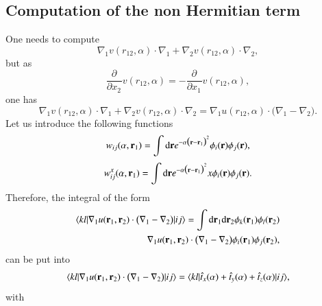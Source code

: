 \documentclass[aip,jcp,reprint,noshowkeys,superscriptaddress]{revtex4-1}
\newcommand{\matelem}[3]{\langle #1 | #2 | #3 \rangle}
\newcommand{\deriv}[3]{\frac{\partial^{#3} #1}{\partial {#2}^{#3}}}
\newcommand{\br}[0]{{\bf {r}}}
\newcommand{\bri}[1]{{\bf r}_{#1}}
\begin{document}
\subsection{Computation of the non Hermitian term}
One needs to compute 
\begin{equation}
 \nabla_1 v(r_{12},\alpha) \cdot \nabla_1 + \nabla_2 v(r_{12},\alpha) \cdot \nabla_2,
\end{equation}
but as 
\begin{equation}
 \deriv{}{x_2}{} v(r_{12},\alpha) = - \deriv{}{x_1}{} v(r_{12},\alpha), 
\end{equation}
one has 
\begin{equation}
  \nabla_1 v(r_{12},\alpha) \cdot \nabla_1 + \nabla_2 v(r_{12},\alpha) \cdot \nabla_2 = \nabla_1 u(r_{12},\alpha) \cdot  \big( \nabla_1 - \nabla_2 \big). 
\end{equation}
Let us introduce the following functions  
\begin{equation}
 w_{ij}(\alpha,\bri{1}) = \int \text{d}\br{} e^{-\alpha \big(\br{} - \bri{1} \big)^2} \phi_i(\br{}) \phi_j(\br{}),
\end{equation}
\begin{equation}
 w_{ij}^x(\alpha,\bri{1}) = \int \text{d}\br{}  e^{-\alpha \big(\br{} - \bri{1} \big)^2} x\phi_i(\br{}) \phi_j(\br{}).
\end{equation}
Therefore, the integral of the form 
\begin{equation}
 \begin{aligned}
 \matelem{kl}{\nabla_1 u(\bri{1},\bri{2}) \cdot  \big( \nabla_1 - \nabla_2 \big)}{ij} = \int \text{d}\bri{1}  \text{d}\bri{2}  \phi_k(\bri{1}) \phi_l(\bri{2}) \\
\nabla_1 u(\bri{1},\bri{2}) \cdot  \big( \nabla_1 - \nabla_2 \big)  \phi_i(\bri{1}) \phi_j(\bri{2}) ,
 \end{aligned}
\end{equation}
can be put into 
\begin{equation}
 \begin{aligned}
 \matelem{kl}{\nabla_1 u(\bri{1},\bri{2}) \cdot  \big( \nabla_1 - \nabla_2 \big)}{ij} = \matelem{kl}{\hat{t}_x(\alpha) + \hat{t}_y(\alpha) + \hat{t}_z(\alpha)}{ij},
 \end{aligned}
\end{equation}
with 
\end{document}
